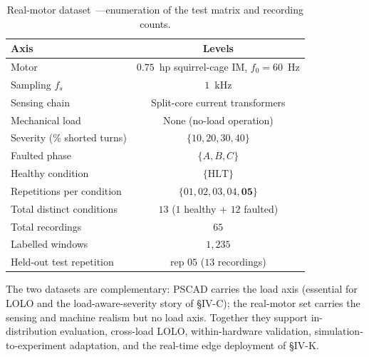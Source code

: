 \documentclass[journal]{IEEEtran}
\begin{document}
\begin{table}[!t]
\caption{Real-motor dataset~\cite{ibarram}---enumeration of the test matrix and recording
counts.}
\label{tab:realmatrix}
\centering
\footnotesize
\begin{tabular}{@{}lc@{}}
\toprule
Axis & Levels \\
\midrule
Motor & $0.75$~hp squirrel-cage IM, $f_0 = 60$~Hz \\
Sampling $f_s$ & $1$~kHz \\
Sensing chain & Split-core current transformers \\
Mechanical load & None (no-load operation) \\
\midrule
Severity (\% shorted turns) & $\{10, 20, 30, 40\}$ \\
Faulted phase & $\{A, B, C\}$ \\
Healthy condition & $\{\mathrm{HLT}\}$ \\
Repetitions per condition & $\{01, 02, 03, 04, \mathbf{05}\}$ \\
\midrule
Total distinct conditions & $13$ ($1$ healthy $+$ $12$ faulted) \\
Total recordings & $65$ \\
Labelled windows & $1{,}235$ \\
Held-out test repetition & rep $05$ ($13$ recordings) \\
\bottomrule
\end{tabular}
\end{table}

The two datasets are complementary: PSCAD carries the load axis (essential for LOLO and
the load-aware-severity story of \S IV-C); the real-motor set carries the sensing and
machine realism but no load axis. Together they support in-distribution evaluation,
cross-load LOLO, within-hardware validation, simulation-to-experiment adaptation, and the
real-time edge deployment of \S IV-K.
\end{document}
